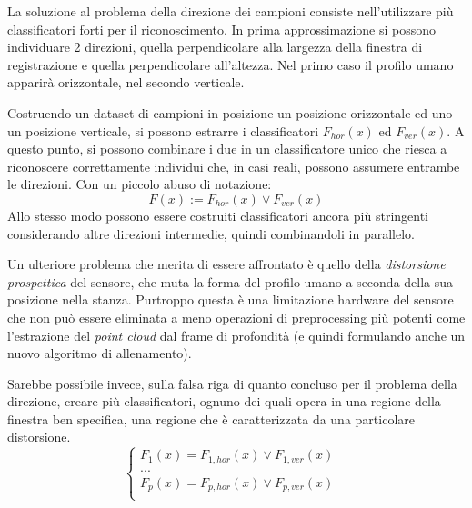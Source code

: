 \documentclass[a4paper,11pt,oneside]{article}
\begin{document}
		La soluzione al problema della direzione dei campioni consiste nell'utilizzare più classificatori forti per il riconoscimento. In prima approssimazione si possono individuare 2 direzioni, quella perpendicolare alla largezza della finestra di registrazione e quella perpendicolare all'altezza. Nel primo caso il profilo umano apparirà orizzontale, nel secondo verticale.

		Costruendo un dataset di campioni in posizione un posizione orizzontale ed uno un posizione verticale, si possono estrarre i classificatori $F_{hor}(x)$ ed $F_{ver}(x)$. A questo punto, si possono combinare i due in un classificatore unico che riesca a riconoscere correttamente individui che, in casi reali, possono assumere entrambe le direzioni. Con un piccolo abuso di notazione:
		$$F(x) := F_{hor}(x) \vee F_{ver}(x) $$
		Allo stesso modo possono essere costruiti classificatori ancora più stringenti considerando altre direzioni intermedie, quindi combinandoli in parallelo.

		Un ulteriore problema che merita di essere affrontato è quello della \emph{distorsione prospettica} del sensore, che muta la forma del profilo umano a seconda della sua posizione nella stanza. Purtroppo questa è una limitazione hardware del sensore che non può essere eliminata a meno operazioni di preprocessing più potenti come l'estrazione del \emph{point cloud} dal frame di profondità (e quindi formulando anche un nuovo algoritmo di allenamento).

		Sarebbe possibile invece, sulla falsa riga di quanto concluso per il problema della direzione, creare più classificatori, ognuno dei quali opera in una regione della finestra ben specifica, una regione che è caratterizzata da una particolare distorsione.
		\begin{equation}
			\begin{cases}
				F_1(x) = F_{1,hor}(x) \vee F_{1,ver}(x) & \\
				... & \\
				F_p(x) = F_{p,hor}(x) \vee F_{p,ver}(x) & \\
			\end{cases}
		\end{equation}

\end{document}
